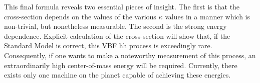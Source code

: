     This final formula reveals two essential pieces of insight.
    The first is that the cross-section depends on the values of the various $\kappa$ values in a manner which is non-trivial,
        but nonetheless measurable.
    The second is the strong energy dependence.
    Explicit calculation of the cross-section will show that, if the Standard Model is correct,
        this VBF \to hh process is exceedingly rare.
    Consequently, if one wants to make a noteworthy measurement of this process,
        an extraordinarily high center-of-mass energy will be required.
    Currently, there exists only one machine on the planet capable of achieving these energies.
